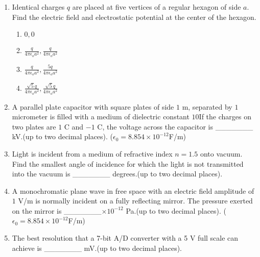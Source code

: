 \documentclass[journal,9pt,onecolumn]{IEEEtran}
\begin{document}
\begin{enumerate}

\item Identical charges $q$ are placed at five vertices of a regular hexagon of side $a$. Find the electric field and electrostatic potential at the center of the hexagon.
\begin{multicols}{4}
\begin{enumerate}
    \item $0, 0$
    \item $\frac{q}{4\pi\epsilon_o a^2}, \frac{q}{4\pi\epsilon_o a^2}$
    \item $\frac{q}{4\pi\epsilon_o a^2}, \frac{5q}{4\pi\epsilon_o a^2}$
    \item $\frac{\sqrt{5}q}{4\pi\epsilon_o a^2}, \frac{\sqrt{5}q}{4\pi\epsilon_o a^2}$
\end{enumerate}
\end{multicols}

\item A parallel plate capacitor with square plates of side $1$ m, separated by $1$ micrometer is filled with a medium of dielectric constant $10$If the charges on two plates are $1$ C and $-1$ C, the voltage across the capacitor is \_\_\_\_\_\_\_ kV.(up to two decimal places). ($\epsilon_0 = 8.854\times10^{-12}$F/m)



\item Light is incident from a medium of refractive index $n = 1.5$ onto vacuum. Find the smallest angle of incidence for which the light is not transmitted into the vacuum is \_\_\_\_\_\_\_ degrees.(up to two decimal places).

\item A monochromatic plane wave in free space with an electric field amplitude of $1$ V/m is normally incident on a fully reflecting mirror. The pressure exerted on the mirror is \_\_\_\_\_\_\_$\times10^{-12}$ Pa.(up to two decimal places). ($\epsilon_0 = 8.854\times10^{-12}$F/m)


\item The best resolution that a 7-bit A/D converter with a 5 V full scale can achieve is \_\_\_\_\_\_\_ mV.(up to two decimal places).



\end{enumerate}
\end{document}
